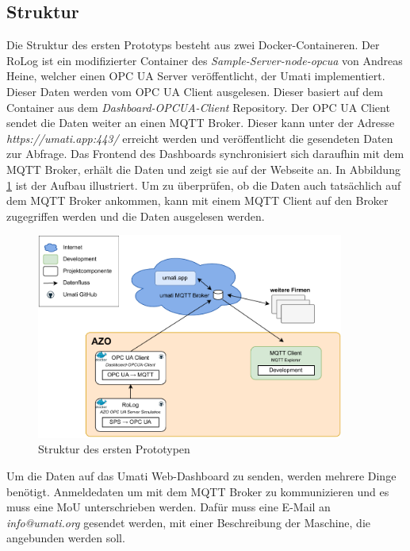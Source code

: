 \documentclass[a4paper, 12pt, oneside, toc=listofnumbered, bibliography=totoc]{scrbook}
\begin{document}
		\subsection{Struktur}
		
		Die Struktur des ersten Prototyps besteht aus zwei Docker-Containeren. Der RoLog ist ein modifizierter Container des \textit{Sample-Server-node-opcua} von Andreas Heine, welcher einen OPC UA Server veröffentlicht, der Umati implementiert. Dieser Daten werden vom OPC UA Client ausgelesen. Dieser basiert auf dem Container aus dem \textit{Dashboard-OPCUA-Client} Repository. Der OPC UA Client sendet die Daten weiter an einen MQTT Broker. Dieser kann unter der Adresse \textit{https://umati.app:443/} erreicht werden und veröffentlicht die gesendeten Daten zur Abfrage. Das Frontend des Dashboards synchronisiert sich daraufhin mit dem MQTT Broker, erhält die Daten und zeigt sie auf der Webseite an. In Abbildung \ref{fig:Prototyp1} ist der Aufbau illustriert. Um zu überprüfen, ob die Daten auch tatsächlich auf dem MQTT Broker ankommen, kann mit einem MQTT Client auf den Broker zugegriffen werden und die Daten ausgelesen werden.
		
		\begin{figure}[H]
			\centering
			\includegraphics[width=0.9\textwidth]{res/implementierung/Prototyp-umatiWeb.pdf}
			\caption{Struktur des ersten Prototypen}
			\label{fig:Prototyp1}
		\end{figure}
		
		Um die Daten auf das Umati Web-Dashboard zu senden, werden mehrere Dinge benötigt. Anmeldedaten um mit dem MQTT Broker zu kommunizieren und es muss eine \ac{MoU} unterschrieben werden. Dafür muss eine E-Mail an \textit{info@umati.org} gesendet werden, mit einer Beschreibung der Maschine, die angebunden werden soll. 
		
\end{document}

